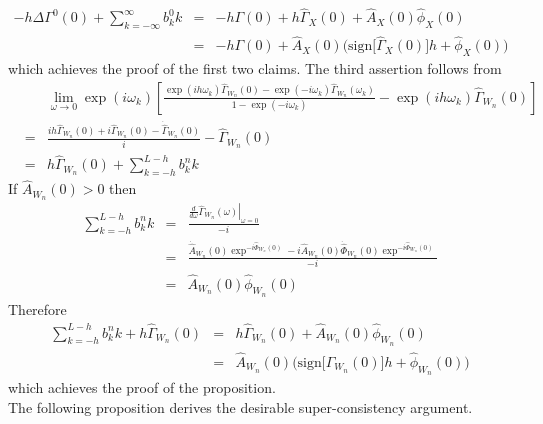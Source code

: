 \documentclass[11pt]{article}
\begin{document}
\begin{appendix}
\begin{eqnarray*}
-h\Delta{\Gamma}^{0}(0)+\sum_{k=-\infty}^{\infty}b_k^0k&=&-h\Gamma(0)+h\hat{\Gamma}_X(0)+\hat{A}_X(0) \hat{\phi}_X(0)\\
&=&-h\Gamma(0)+\hat{A}_X(0)\Big(\textrm{sign}\big[\hat{\Gamma}_X(0)\big]h+ \hat{\phi}_X(0)\Big)
\end{eqnarray*}
which achieves the proof of the first two claims. The third assertion follows from
\begin{eqnarray}
&&\lim_{\omega\to 0}\exp(i\omega_k)\left[\frac{\exp(ih\omega_k)\hat{\Gamma}_{W_n}(0)-\exp(-i\omega_k)\hat{\Gamma}_{W_n}(\omega_k)}{1-\exp(-i\omega_k)}-\exp(ih\omega_k)\hat{\Gamma}_{W_n}(0)\right]\nonumber\\
&=&\frac{ih\hat{\Gamma}_{W_n}(0)+i\hat{\Gamma}_{W_n}(0)-\dot{\hat{\Gamma}}_{W_n}(0)}{i}-\hat{\Gamma}_{W_n}(0)\nonumber\\
&=&h\hat{\Gamma}_{W_n}(0)+\sum_{k=-h}^{L-h} b_k^nk
\end{eqnarray}
If $\hat{A}_{W_n}(0)>0$ then
\begin{eqnarray*}
\sum_{k=-h}^{L-h}b_k^nk&=&\frac{\left.\frac{d}{d\omega}\hat{\Gamma}_{W_n}(\omega)\right|_{\omega=0}}{-i}\\
&=&\frac{\dot{\hat{A}}_{W_n}(0)\exp^{-i\hat{\Phi}_{W_n}(0)}-i \hat{A}_{W_n}(0)\dot{\hat{\Phi}}_{W_n}(0)\exp^{-i\hat{\Phi}_{W_n}(0)}}{-i}\\
&=&\hat{A}_{W_n}(0) \hat{\phi}_{W_n}(0)
\end{eqnarray*}
Therefore
\begin{eqnarray*}
\sum_{k=-h}^{L-h} b_k^nk+h\hat{\Gamma}_{W_n}(0)&=&h\hat{\Gamma}_{W_n}(0)+\hat{A}_{W_n}(0) \hat{\phi}_{W_n}(0)\\
&=&\hat{A}_{W_n}(0)\Big(\textrm{sign}\big[\hat{\Gamma}_{W_n}(0)\big]h+ \hat{\phi}_{W_n}(0)\Big)
\end{eqnarray*}
which achieves the proof of the proposition.\\

The following proposition derives the desirable super-consistency argument.


\end{appendix}
\end{document}
